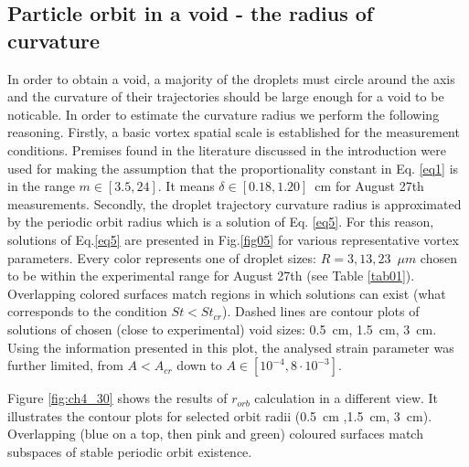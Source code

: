 \documentclass[../main.tex]{subfiles}
\begin{document}
\subsection{Particle orbit in a void - the radius of curvature}
\label{ssec:par}
In order to obtain a void, a majority of the droplets must circle around the axis and the curvature of their trajectories should be large enough for a void to be noticable. In order to estimate the curvature radius we perform the following reasoning. 
Firstly, a basic vortex spatial scale is established for the measurement conditions. Premises found in the literature discussed in the introduction were used for making the assumption that the proportionality constant in Eq. \ref{eq1} is in the range $m\in[3.5, 24]$. It means $\delta \in [0.18,1.20]$~cm for August 27th measurements.
Secondly, the droplet trajectory curvature radius is approximated by the periodic orbit radius which is a solution of Eq. \ref{eq5}. For this reason, solutions of Eq.\ref{eq5} are presented in Fig.\ref{fig05} for various representative vortex parameters. Every color represents one of droplet sizes: $R=3,13,23$~$\mu m$ chosen to be within the experimental range for August 27th (see Table \ref{tab01}). Overlapping colored surfaces match regions in which solutions can exist (what corresponds to the condition $St<St_{cr}$). Dashed lines are contour plots of solutions of chosen (close to experimental) void sizes: 0.5~cm, 1.5~cm, 3~cm. Using the information presented in this plot, the analysed strain parameter was further limited, from $A<A_{cr}$ down to $A \in [10^{-4}, 8\cdot10^{-3}]$.

Figure \ref{fig:ch4_30} shows the results of $r_{orb}$ calculation in a different view. It illustrates the contour plots for selected orbit radii (0.5~cm ,1.5~cm, 3~cm). Overlapping (blue on a top, then pink and green) coloured surfaces match subspaces of stable periodic orbit existence.
\end{document}
